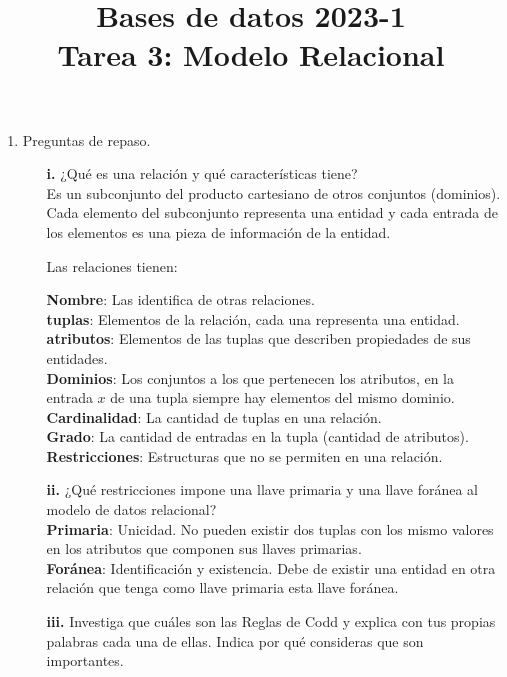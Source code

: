 \documentclass[12pt,a4paper]{article}
\title{Bases de datos 2023-1\\
Tarea 3: Modelo Relacional}
\begin{document}
\maketitle

\begin{enumerate}
	\item Preguntas de repaso.
		\begin{enumerate}
			\item[\textbf{i.}] ¿Qué es una relación y qué características tiene?\\

				Es un subconjunto del producto cartesiano de otros conjuntos (dominios).
				Cada elemento del subconjunto representa una entidad y cada entrada de los
				elementos es una pieza de información de la entidad.

				Las relaciones tienen:

				\textbf{Nombre}: Las identifica de otras relaciones.\\
				\textbf{tuplas}: Elementos de la relación, cada una representa una entidad.\\
				\textbf{atributos}: Elementos de las tuplas que describen propiedades de sus entidades.\\
				\textbf{Dominios}: Los conjuntos a los que pertenecen los atributos, en la entrada $x$
				de una tupla siempre hay elementos del mismo dominio.\\
				\textbf{Cardinalidad}: La cantidad de tuplas en una relación.\\
				\textbf{Grado}: La cantidad de entradas en la tupla (cantidad de atributos).\\
				\textbf{Restricciones}: Estructuras que no se permiten en una relación.\\	


			\item[\textbf{ii.}] ¿Qué restricciones impone una llave primaria y
				una llave foránea al modelo de datos relacional?\\

				\textbf{Primaria}: Unicidad. No pueden existir dos tuplas con los mismo valores
				en los atributos que componen sus llaves primarias.\\

				\textbf{Foránea}: Identificación y existencia. Debe de existir una entidad
				en otra relación que tenga como llave primaria esta llave foránea.\\


			\item[\textbf{iii.}] Investiga que cuáles son las Reglas de Codd y explica con tus propias palabras
				cada una de ellas. Indica por qué consideras que son importantes.\\


\end{enumerate}
\end{enumerate}
\end{document}
